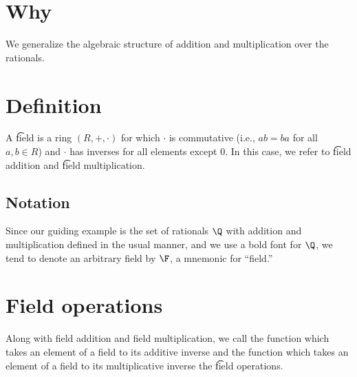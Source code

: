 
\section*{Why}

We generalize the algebraic structure of addition and multiplication over the rationals.

\section*{Definition}

A \t{field} is a ring $(R, +, \cdot  )$ for which $\cdot  $ is commutative (i.e., $ab = ba$ for all $a, b \in R$) and $\cdot  $ has inverses for all elements except $0$.
In this case, we refer to \t{field addition} and \t{field multiplication}.

\subsection*{Notation}

Since our guiding example is the set of rationals $\Q  $ with addition and multiplication defined in the usual manner, and we use a bold font for $\Q  $, we tend to denote an arbitrary field by $\F  $, a mnemonic for ``field.''

\section*{Field operations}

Along with field addition and field multiplication, we call the function which takes an element of a field to its additive inverse and the function which takes an element of a field to its multiplicative inverse the \t{field operations}.
\blankpage

